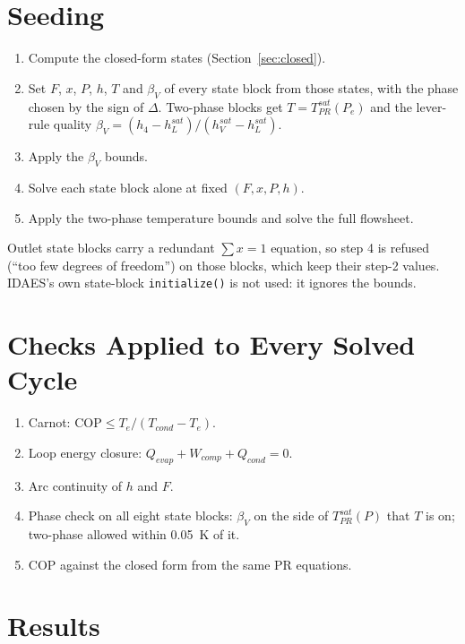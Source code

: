 \documentclass{article}
\begin{document}
\section{Seeding}
\begin{enumerate}
\item Compute the closed-form states (Section~\ref{sec:closed}).
\item Set $F$, $x$, $P$, $h$, $T$ and $\beta_V$ of every state block from those
states, with the phase chosen by the sign of $\Delta$. Two-phase blocks get
$T = T^{sat}_{PR}(P_e)$ and the lever-rule quality
$\beta_V = (h_4 - h_L^{sat})/(h_V^{sat}-h_L^{sat})$.
\item Apply the $\beta_V$ bounds.
\item Solve each state block alone at fixed $(F,x,P,h)$.
\item Apply the two-phase temperature bounds and solve the full flowsheet.
\end{enumerate}
Outlet state blocks carry a redundant $\sum x = 1$ equation, so step 4 is
refused (``too few degrees of freedom'') on those blocks, which keep their
step-2 values. IDAES's own state-block \texttt{initialize()} is not used: it
ignores the bounds.

\section{Checks Applied to Every Solved Cycle}
\begin{enumerate}
\item Carnot: $\mathrm{COP} \le T_e/(T_{cond}-T_e)$.
\item Loop energy closure: $Q_{evap} + W_{comp} + Q_{cond} = 0$.
\item Arc continuity of $h$ and $F$.
\item Phase check on all eight state blocks: $\beta_V$ on the side of
$T^{sat}_{PR}(P)$ that $T$ is on; two-phase allowed within \SI{0.05}{\kelvin} of it.
\item COP against the closed form from the same PR equations.
\end{enumerate}

\section{Results}
\end{document}
